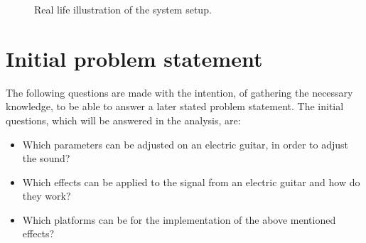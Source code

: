 
\begin{figure}
\centering
\def\svgwidth{\columnwidth}
\scalebox{0.7}{}
\caption{Real life illustration of the system setup.}
		\label{fig:real_life_drawing}
\end{figure}

\section{Initial problem statement}
The following questions are made with the intention, of gathering the necessary knowledge, to be able to answer  a later stated problem statement. The initial questions, which will be answered in the analysis, are:

\begin{itemize}
\item Which parameters can be adjusted on an electric guitar, in order to adjust the sound?
\item Which effects can be applied to the signal from an electric guitar and how do they work?
\item Which platforms can be for the implementation of the above mentioned effects? 
\end{itemize}